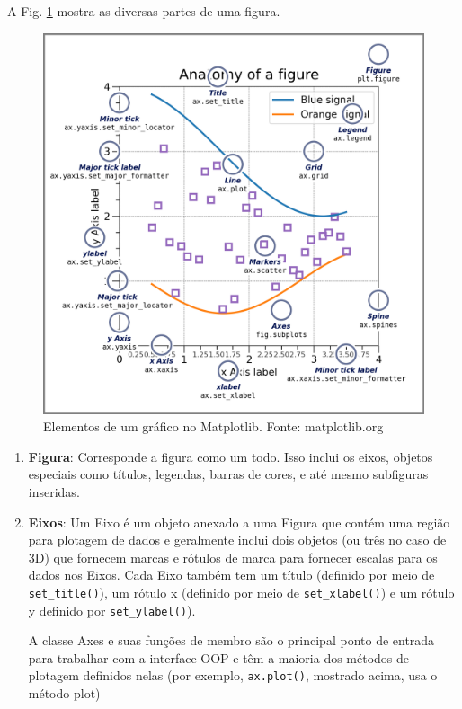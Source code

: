 A Fig. \ref{fig:anatomy} mostra as diversas partes de uma figura.


\begin{figure}
    \centering
    \includegraphics[scale=0.2]{Images/anatomy.png}
    \caption{Elementos de um gráfico no Matplotlib. Fonte: matplotlib.org}
    \label{fig:anatomy}
\end{figure}

\begin{enumerate}
    \item {\bf Figura}: Corresponde a figura como um todo. Isso inclui os eixos, objetos especiais como títulos, legendas, barras de cores,  e até mesmo subfiguras inseridas.
    \item {\bf Eixos}: Um Eixo é um objeto anexado a uma Figura que contém uma região para plotagem de dados e geralmente inclui dois objetos (ou três no caso de 3D) que fornecem marcas e rótulos de marca para fornecer escalas para os dados nos Eixos. Cada Eixo também tem um título (definido por meio de \lstinline{set_title()}), um rótulo x (definido por meio de \lstinline{set_xlabel()}) e um rótulo y definido por \lstinline{set_ylabel()}).

A classe Axes e suas funções de membro são o principal ponto de entrada para trabalhar com a interface OOP e têm a maioria dos métodos de plotagem definidos nelas (por exemplo, \lstinline{ax.plot()}, mostrado acima, usa o método plot)
\end{enumerate}


